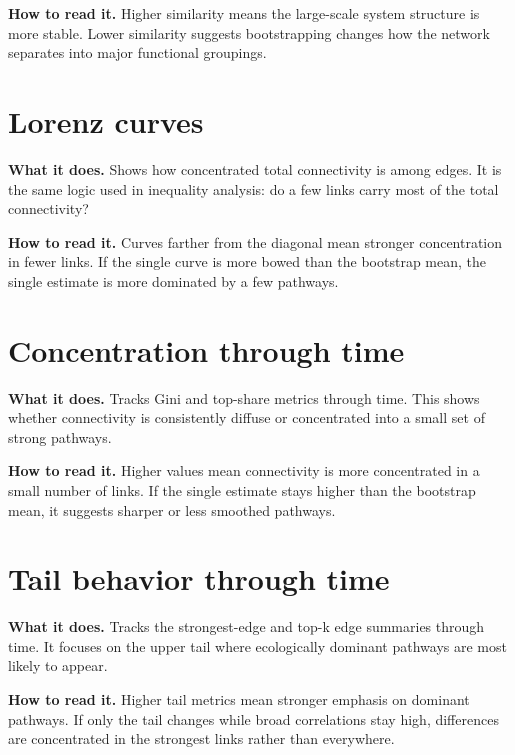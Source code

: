 \documentclass[11pt,a4paper]{article}
\begin{document}
\textbf{How to read it.} Higher similarity means the large-scale system structure is more stable.
Lower similarity suggests bootstrapping changes how the network separates into major functional groupings.

\section{Lorenz curves}

\textbf{What it does.} Shows how concentrated total connectivity is among edges.
It is the same logic used in inequality analysis: do a few links carry most of the total connectivity?


\textbf{How to read it.} Curves farther from the diagonal mean stronger concentration in fewer links.
If the single curve is more bowed than the bootstrap mean, the single estimate is more dominated by a few pathways.

\section{Concentration through time}

\textbf{What it does.} Tracks Gini and top-share metrics through time.
This shows whether connectivity is consistently diffuse or concentrated into a small set of strong pathways.


\textbf{How to read it.} Higher values mean connectivity is more concentrated in a small number of links.
If the single estimate stays higher than the bootstrap mean, it suggests sharper or less smoothed pathways.

\section{Tail behavior through time}

\textbf{What it does.} Tracks the strongest-edge and top-k edge summaries through time.
It focuses on the upper tail where ecologically dominant pathways are most likely to appear.


\textbf{How to read it.} Higher tail metrics mean stronger emphasis on dominant pathways.
If only the tail changes while broad correlations stay high, differences are concentrated in the strongest links rather than everywhere.
\end{document}
